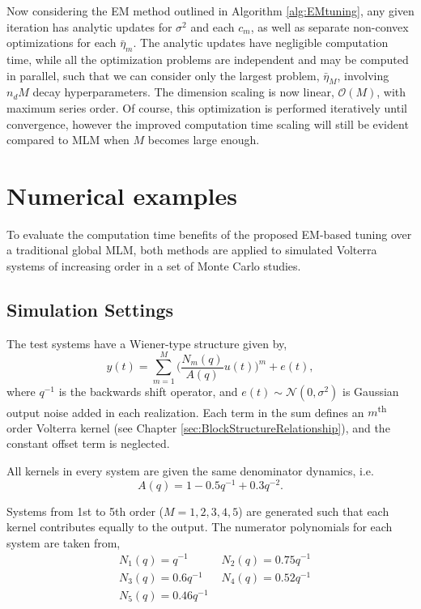 Now considering the EM method outlined in Algorithm \ref{alg:EMtuning}, any given iteration has analytic updates for $\sigma^2$ and each $c_m$, as well as separate non-convex optimizations for each $\bar{\eta}_m$. The analytic updates have negligible computation time, while all the optimization problems are independent and may be computed in parallel, such that we can consider only the largest problem, $\bar{\eta}_M$, involving $n_d M$ decay hyperparameters. The dimension scaling is now linear, $\mathcal{O}(M)$, with maximum series order. Of course, this optimization is performed iteratively until convergence, however the improved computation time scaling will still be evident compared to MLM when $M$ becomes large enough.

\section{Numerical examples}
\label{sec:NumEx_EM}

To evaluate the computation time benefits of the proposed EM-based tuning over a traditional global MLM, both methods are applied to simulated Volterra systems of increasing order in a set of Monte Carlo studies. 

\subsection{Simulation Settings}

The test systems have a Wiener-type structure given by,
\begin{equation}
y(t) = \sum_{m=1}^M \bigg( \frac{N_m(q)}{A(q)}u(t)\bigg)^m +e(t),
\end{equation}   
where $q^{-1}$ is the backwards shift operator, and $e(t) \sim \mathcal{N}(0,\sigma^2)$ is Gaussian output noise added in each realization. Each term in the sum defines an $m$\textsuperscript{th} order Volterra kernel (see Chapter \ref{sec:BlockStructureRelationship}), and the constant offset term is neglected.

All kernels in every system are given the same denominator dynamics, i.e.
\begin{equation}
A(q) = 1 - 0.5q^{-1} + 0.3q^{-2}.
\end{equation}

Systems from 1st to 5th order ($M = 1,2,3,4,5$) are generated such that each kernel contributes equally to the output.  The numerator polynomials for each system are taken from,
\begin{align*}
&N_1(q) = q^{-1} \; \; \; &N_2(q) = 0.75q^{-1} \\
&N_3(q) = 0.6q^{-1} \; \; \; &N_4(q) = 0.52q^{-1}  \\
&N_5(q) = 0.46q^{-1} 
\end{align*}

